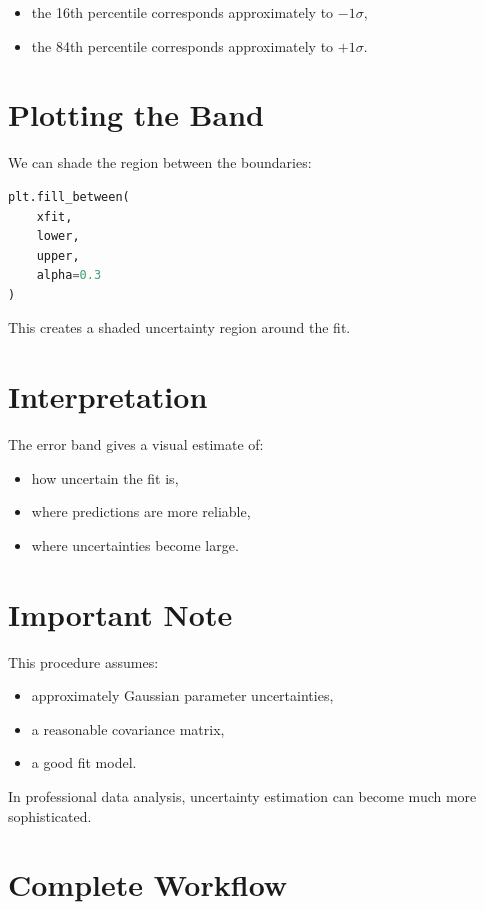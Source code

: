 \documentclass[11pt]{article}
\begin{document}
\begin{itemize}
    \item the 16th percentile corresponds approximately to \(-1\sigma\),
    \item the 84th percentile corresponds approximately to \(+1\sigma\).
\end{itemize}

\section{Plotting the Band}

We can shade the region between the boundaries:

\begin{lstlisting}[language=Python]
plt.fill_between(
    xfit,
    lower,
    upper,
    alpha=0.3
)
\end{lstlisting}

This creates a shaded uncertainty region around the fit.

\section{Interpretation}

The error band gives a visual estimate of:

\begin{itemize}
    \item how uncertain the fit is,
    \item where predictions are more reliable,
    \item where uncertainties become large.
\end{itemize}

\section{Important Note}

This procedure assumes:

\begin{itemize}
    \item approximately Gaussian parameter uncertainties,
    \item a reasonable covariance matrix,
    \item a good fit model.
\end{itemize}

In professional data analysis, uncertainty estimation can become much more sophisticated.

\section{Complete Workflow}
\end{document}
